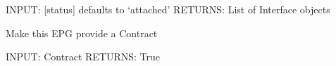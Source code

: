 \documentclass[letterpaper,10pt,english]{sphinxmanual}
\begin{document}
\begin{fulllineitems}
\begin{fulllineitems}
INPUT: {[}status{]} defaults to `attached'
RETURNS: List of Interface objects

\end{fulllineitems}


\begin{fulllineitems}
\label{acitoolkit:acitoolkit.CommonEPG.provide}
Make this EPG provide a Contract

INPUT: Contract
RETURNS: True

\end{fulllineitems}


\end{fulllineitems}

\end{document}
